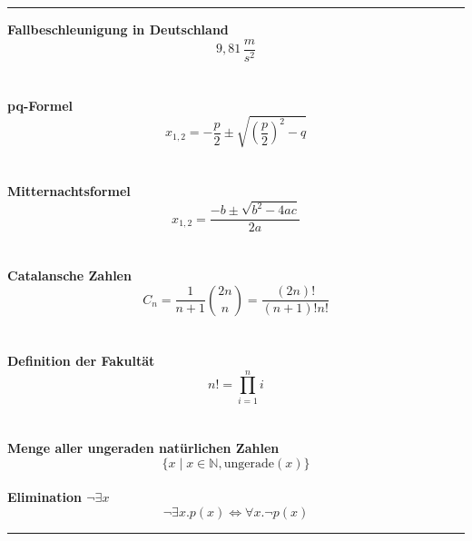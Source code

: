 \documentclass[a4paper, ngerman]{report}
\begin{document}
\thispagestyle{empty}

\hrule
\begin{center}

\textbf{Fallbeschleunigung in Deutschland}
$$9,81\,\frac{m}{s^2}$$ \\
~ \\

\textbf {pq-Formel}
$$x_{1,2} = - \frac{p}{2} \pm \sqrt{\left(\frac{p}{2}\right)^2 - q}$$ \\
~ \\

\textbf{Mitternachtsformel} 
$$x_{1,2} = \frac{-b \pm \sqrt{b^2 - 4ac}}{2a}$$ \\
~ \\

\textbf{Catalansche Zahlen}
\begin{equation*} C_n = \frac{1}{n+1} {2n \choose n} = \frac{(2n)!}{(n+1)!n!} \end{equation*} \\
~ \\

\textbf{Definition der Fakultät} 
$$n! = \prod_{i=1}^{n} i$$ \\
~ \\

\textbf{Menge aller ungeraden natürlichen Zahlen}
$$\{ x \mid x \in \mathds{N}, \mathrm{ungerade}(x) \}$$
~ \\

\textbf{Elimination $\neg\exists x$}
$$\neg\exists x . p(x) \Leftrightarrow \forall x . \neg p(x)$$
\end{center}

\hrule
\end{document}

